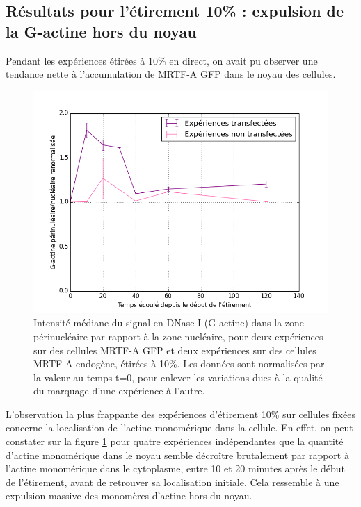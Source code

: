 \subsection{Résultats pour l'étirement 10\% : expulsion de la G-actine hors du noyau}

Pendant les expériences étirées à 10\% en direct, on avait pu observer une tendance nette à l'accumulation de MRTF-A GFP dans le noyau des cellules. 

\begin{figure}
\includegraphics[scale=0.5]{Figures/Et10_G_ratio.png} 
\caption{\label{Et10_G} Intensité médiane du signal en DNase I (G-actine) dans la zone périnucléaire par rapport à la zone nucléaire, pour deux expériences sur des cellules MRTF-A GFP et deux expériences sur des cellules MRTF-A endogène, étirées à 10\%. Les données sont normalisées par la valeur au temps t=0, pour enlever les variations dues à la qualité du marquage d'une expérience à l'autre.}
\end{figure}

L'observation la plus frappante des expériences d'étirement 10\% sur cellules fixées concerne la localisation de l'actine monomérique dans la cellule. En effet, on peut constater sur la figure \ref{Et10_G} pour quatre expériences indépendantes que la quantité d'actine monomérique dans le noyau semble décroître brutalement par rapport à l'actine monomérique dans le cytoplasme, entre 10 et 20 minutes après le début de l'étirement, avant de retrouver sa localisation initiale. Cela ressemble à une expulsion massive des monomères d'actine hors du noyau. 

